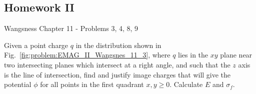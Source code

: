 \documentclass[crop=false,class=book,oneside]{standalone}
\begin{document}
        \subsection{Homework II}
            Wangsness Chapter 11 - Problems 3, 4, 8, 9
            \begin{problem}
                \label{problem:EMAG_II_Wangsnes_11_3}
                Given a point charge $q$ in the distribution shown
                in Fig.~\ref{fig:problem:EMAG_II_Wangsnes_11_3},
                where $q$ lies in the $xy$ plane near two
                intersecting planes which intersect at a right angle,
                and such that the $z$ axis is the line of
                intersection, find and justify image charges that
                will give the potential $\phi$ for all points in
                the first quadrant $x,y\geq{0}$.
                Calculate $E$ and $\sigma_{f}$.
            \end{problem}
\end{document}
